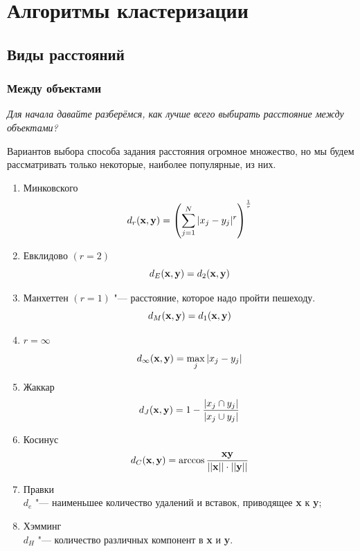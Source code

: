 \newpage
\section{Алгоритмы кластеризации}

\subsection{Виды расстояний}
\subsubsection{Между объектами}
{\it Для начала давайте разберёмся, как лучше всего выбирать расстояние между объектами?}

Вариантов выбора способа задания расстояния огромное множество, но мы будем рассматривать только некоторые, наиболее популярные, из них.
\begin{enumerate}
\item Минковского
\[
d_r({\bf x, y}) = \left( \sum\limits_{j=1}^{N} |x_j - y_j|^r \right)^{\frac{1}{r}}
\]
\item Евклидово $(r = 2)$
\[
d_{E} ({\bf x, y}) = d_2({\bf x, y})
\]
\item Манхеттен $(r = 1)$ "--- расстояние, которое надо пройти пешеходу.
\[
d_{M} ({\bf x, y}) = d_1({\bf x, y})
\]
\item $r = \infty$
\[
d_{\infty} ({\bf x, y}) = \max\limits_{j} |x_j - y_j|
\]
\item Жаккар
\[
d_{J} ({\bf x, y}) = 1 - \frac{|x_j \cap y_j|}{|x_j \cup y_j|}
\]
\item Косинус
\[
d_{C} ({\bf x, y}) =\arccos\frac{{\bf xy}}{||{\bf x}|| \cdot ||{\bf y}||}
\]
\item Правки\\
$d_{e}$ "--- наименьшее количество удалений и вставок, приводящее {\bf x} к {\bf y};
\item Хэмминг\\
$d_{H}$ "--- количество различных компонент в {\bf x} и {\bf y}.

\end{enumerate}


